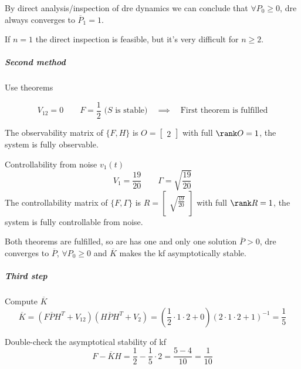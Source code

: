 \begin{exa}
\begin{figure}[H]
    \end{figure}

    By direct analysis/inspection of \gls{dre} dynamics we can conclude that $\forall P_0\ge 0$, \gls{dre} always converges to $\overline{P}_1=1$.

    If $n=1$ the direct inspection is feasible, but it's very difficult for $n\ge2$.

    \subparagraph{Second method} Use theorems

    \[
        V_{12} = 0 \qquad F = \frac{1}{2} \text{ ($S$ is stable)} \quad \implies \quad \text{First theorem is fulfilled}
    \]

    The observability matrix of $\{F, H\}$ is $O=\begin{bmatrix} 2 \end{bmatrix}$ with full $\rank O = 1$, the system is fully observable.

    Controllability from noise $v_1(t)$
    \[
        V_1 = \frac{19}{20} \qquad \Gamma=\sqrt{\frac{19}{20}}
    \]
    The controllability matrix of $\{F, \Gamma\}$ is $R = \begin{bmatrix} \sqrt{\frac{19}{20}} \end{bmatrix}$ with full $\rank R = 1$, the system is fully controllable from noise.

    Both theorems are fulfilled, so \gls{are} has one and only one solution $\overline{P} > 0$, \gls{dre} converges to $\overline{P}$, $\forall P_0\ge0$ and $\overline{K}$ makes the \gls{kf} asymptotically stable.

    \subparagraph{Third step} Compute $\overline{K}$
    \[
        \overline{K} = \left(F\overline{P}H^T + V_{12}\right)\left(H\overline{P}H^T+V_2\right) = \left(\frac{1}{2}\cdot 1 \cdot 2 + 0\right) \left(2\cdot 1 \cdot 2 + 1\right)^{-1} = \frac{1}{5}
    \]

    Double-check the asymptotical stability of \gls{kf}
    \[
        F - \overline{K}H = \frac{1}{2} - \frac{1}{5}\cdot 2 = \frac{5-4}{10} = \frac{1}{10}
    \]

    \begin{figure}[H]
        \centering
\end{figure}
\end{exa}

